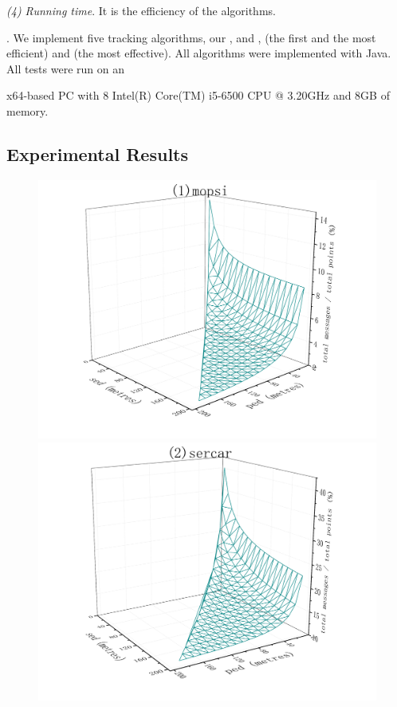  \ni \emph{(4) Running time}. It is the efficiency of the algorithms.
 
.
We implement five tracking algorithms, \ie our \citt, \sitt and \bitt, \ldrh (the first and the most efficient) and \grts (the most effective).
All algorithms were implemented with Java.
All tests were run on an {x64-based  PC with 8 Intel(R) Core(TM) i5-6500 CPU @ 3.20GHz and 8GB of memory.


\subsection{Experimental Results}


\begin{figure}[tb!]
	\centering
	\includegraphics[scale = 0.210]{figures/Fig-BITT-mopsi-total-messages.png}\hspace{1ex}
	\includegraphics[scale = 0.210]{figures/Fig-BITT-sercar-total-messages.png}\hspace{1ex}

\end{figure}}
